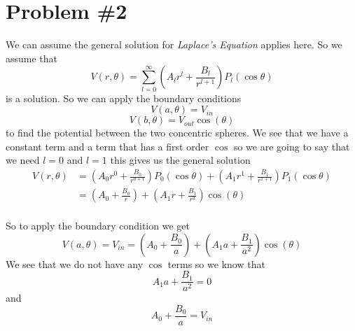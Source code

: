 \documentclass[11pt]{article}
\numberwithin{equation}{section}
\begin{document}
\section{Problem \#2}
We can assume the general solution for \emph{Laplace's Equation} applies here. So we assume that
$$V(r,\theta) = \sum_{l=0}^{\infty}\left(A_lr^l+\frac{B_l}{r^{l+1}}\right)P_l(\cos\theta)$$
is a solution. So we can apply the boundary conditions
$$V(a,\theta) = V_{in}$$
$$V(b,\theta) = V_{out} \cos(\theta)$$
to find the potential between the two concentric spheres. We see that we have a constant term and a term that has a first order $\cos$ so we are going to say that we need $l=0$ and $l=1$ this gives us the general solution 
\begin{align*}
V(r,\theta) &= \left(A_0r^0+\frac{B_0}{r^{0+1}}\right)P_0(\cos\theta) + \left(A_1r^1+\frac{B_1}{r^{1+1}}\right)P_1(\cos\theta)\\
&= \left(A_0+\frac{B_0}{r}\right) + \left(A_1r+\frac{B_1}{r^{2}}\right)\cos(\theta)\\
\end{align*}

So to apply the boundary condition we get
$$V(a,\theta) = V_{in} = \left(A_0+\frac{B_0}{a}\right) + \left(A_1a+\frac{B_1}{a^{2}}\right)\cos(\theta)$$
We see that we do not have any $\cos$ terms so we know that 
$$A_1a+\frac{B_1}{a^2} = 0$$
and
$$A_0+\frac{B_0}{a} = V_{in}$$
\end{document}
